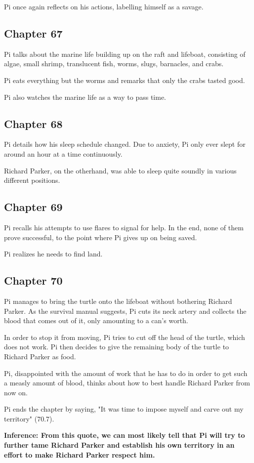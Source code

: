 \documentclass[11pt]{article}
\begin{document}
Pi once again reflects on his actions, labelling himself as a savage.
\subsection{Chapter 67}
\label{sec:org25cc6da}
Pi talks about the marine life building up on the raft and lifeboat, consisting of algae, small shrimp, translucent fish, worms, slugs, barnacles, and crabs.

Pi eats everything but the worms and remarks that only the crabs tasted good.

Pi also watches the marine life as a way to pass time.
\subsection{Chapter 68}
\label{sec:orgd0bc555}
Pi details how his sleep schedule changed. Due to anxiety, Pi only ever slept for around an hour at a time continuously.

Richard Parker, on the otherhand, was able to sleep quite soundly in various different positions.
\subsection{Chapter 69}
\label{sec:org547a8b8}
Pi recalls his attempts to use flares to signal for help. In the end, none of them prove successful, to the point where Pi gives up on being saved.

Pi realizes he needs to find land.
\subsection{Chapter 70}
\label{sec:orge05bca9}
Pi manages to bring the turtle onto the lifeboat without bothering Richard Parker. As the survival manual suggests, Pi cuts its neck artery and collects the blood that comes out of it, only amounting to a can's worth.

In order to stop it from moving, Pi tries to cut off the head of the turtle, which does not work. Pi then decides to give the remaining body of the turtle to Richard Parker as food.

Pi, disappointed with the amount of work that he has to do in order to get such a measly amount of blood, thinks about how to best handle Richard Parker from now on.

Pi ends the chapter by saying, "It was time to impose myself and carve out my territory" (70.7).

\textbf{Inference: From this quote, we can most likely tell that Pi will try to further tame Richard Parker and establish his own territory in an effort to make Richard Parker respect him.} 
\end{document}
